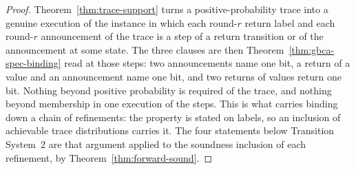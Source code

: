 \begin{proof}\leanok
  Theorem~\ref{thm:trace-support} turns a positive-probability trace into a genuine execution of the instance in which each round-$r$ return label and each round-$r$ announcement of the trace is a step of a return transition or of the announcement at some state.
  The three clauses are then Theorem~\ref{thm:gbca-spec-binding} read at those steps: two announcements name one bit, a return of a value and an announcement name one bit, and two returns of values return one bit.
  Nothing beyond positive probability is required of the trace, and nothing beyond membership in one execution of the steps.
  This is what carries binding down a chain of refinements: the property is stated on labels, so an inclusion of achievable trace distributions carries it.
  The four statements below Transition System~2 are that argument applied to the soundness inclusion of each refinement, by Theorem~\ref{thm:forward-sound}.
\end{proof}
